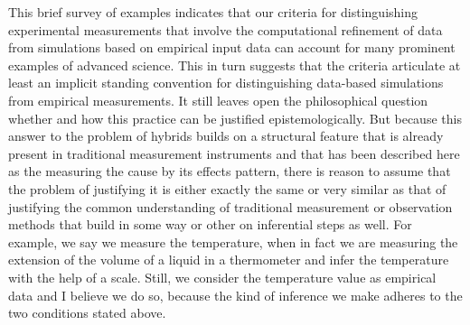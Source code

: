 \documentclass[12pt, a4paper]{article}
\numberwithin{equation}{section}
\begin{document}
This brief survey of examples indicates that our criteria for distinguishing experimental measurements that involve the computational refinement of data from simulations based on empirical input data can account for many prominent examples of advanced science. This in turn suggests that the criteria articulate at least an implicit standing convention for distinguishing data-based simulations from empirical measurements. It still leaves open the philosophical question whether and how this practice can be justified epistemologically. But because this answer to the problem of hybrids builds on a structural feature that is already present in traditional measurement instruments and that has been described here as the measuring the cause by its effects pattern, there is reason to assume that the problem of justifying it is either exactly the same or very similar as that of justifying the common understanding of traditional measurement or observation methods that build in some way or other on inferential steps as well. For example, we say we measure the temperature, when in fact we are measuring the extension of the volume of a liquid in a thermometer and infer the temperature with the help of a scale. Still, we consider the temperature value as empirical data and I believe we do so, because the kind of inference we make adheres to the two conditions stated above.






\end{document}
